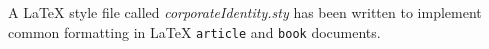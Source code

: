A LaTeX style file called \emph{corporateIdentity.sty} has been written to implement common formatting in LaTeX \texttt{article} and \texttt{book} documents.